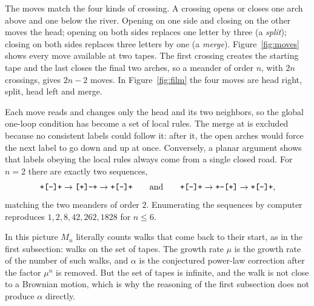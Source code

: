The moves match the four kinds of crossing. A crossing opens or closes one arch above and one
below the river. Opening on one side and closing on the other moves the head; opening on both
sides replaces one letter by three (a \emph{split}); closing on both sides replaces three letters
by one (a \emph{merge}). Figure~\ref{fig:moves} shows every move available at two tapes. The first
crossing creates the starting tape and the last closes the final two arches, so a meander of order
$n$, with $2n$ crossings, gives $2n-2$ moves. In Figure~\ref{fig:film} the four moves are head
right, split, head left and merge.

Each move reads and changes only the head and its two neighbors, so the global one-loop condition
has become a set of local rules. The merge at \tape{+}\hd{+}\tape{+} is excluded because no
consistent labels could follow it: after it, the open arches would force the next label to go
down and up at once. Conversely, a planar argument shows that labels obeying the local rules always
come from a single closed road. For $n=2$ there are exactly two sequences,
\[ \texttt{+}\texttt{[-]}\texttt{+} \to \texttt{[+]}\texttt{-+} \to \texttt{+}\texttt{[-]}\texttt{+}
\qquad\text{and}\qquad
\texttt{+}\texttt{[-]}\texttt{+} \to \texttt{+-}\texttt{[+]} \to \texttt{+}\texttt{[-]}\texttt{+},\]
matching the two meanders of order $2$. Enumerating the sequences by computer reproduces
$1, 2, 8, 42, 262, 1828$ for $n\le 6$.

In this picture $M_n$ literally counts walks that come back to their start, as in the first
subsection: walks on the set of tapes. The growth rate $\mu$ is the growth rate of the number of
such walks, and $\alpha$ is the conjectured power-law correction after the factor $\mu^n$ is removed. But the set
of tapes is infinite, and the walk is not close to a Brownian motion, which is why the reasoning
of the first subsection does not produce $\alpha$ directly.

